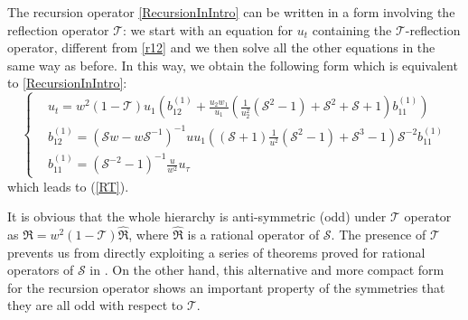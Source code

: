 \documentclass[fleqn,11pt,twoside]{article}
\newcommand\cS{{\mathcal S}}
\newcommand\cT{{\mathcal T}}
\theoremstyle{definition}
\begin{document}
The recursion operator \eqref{RecursionInIntro} can be written in a form involving the reflection operator $\cT$:
we start with an equation for $u_t$ containing the
$\mathcal{T}$-reflection operator, different from \eqref{r12} and
we then solve all the other equations in the same way as before. In this way, we obtain the following form
which is equivalent to \eqref{RecursionInIntro}:
	\begin{equation*}
		\begin{cases}
			&u_t = w^2 (1-\mathcal{T}) u_1
\left(b^{(1)}_{12}+\frac{u_2 w_1}{u_1}
\left(\frac{1}{u_2^2}\left(\mathcal{S}^2-1\right)+\mathcal{S}^2+\mathcal{S}
+1\right) b^{(1)}_{11}\right)\\
			& b^{(1)}_{1 2}= \left( \mathcal{S} w - w
\mathcal{S}^{-1} \right)^{-1} u u_1 \left( \left( \mathcal{S}+1
\right)\frac{1}{u^2}\left( \mathcal{S}^2-1\right) + \mathcal{S}^3-1\right) \cS^{-2}
b^{(1)}_{    11} \\
			& b^{(1)}_{
11}=(\mathcal{S}^{-2}-1)^{-1}\frac{u}{w^2}u_\tau
		\end{cases}
		\label{5.6bis}
	\end{equation*}
which leads to (\ref{RT}).

It is obvious that the whole hierarchy is anti-symmetric (odd) under
$\mathcal{T}$ operator as $\mathfrak{R} = w^2 (1-\mathcal{T})
\hat{\mathfrak{R}}$, where $\hat{\mathfrak{R}}$ is a rational operator of $\cS$.
The presence of $\mathcal{T}$ prevents us from directly exploiting a series of
theorems proved for rational operators of $\cS$ in \cite{4}. On the other hand, this
alternative and more compact form for the recursion operator shows an important property of the
symmetries that they are all odd with respect to $\mathcal{T}$.
\end{document}
